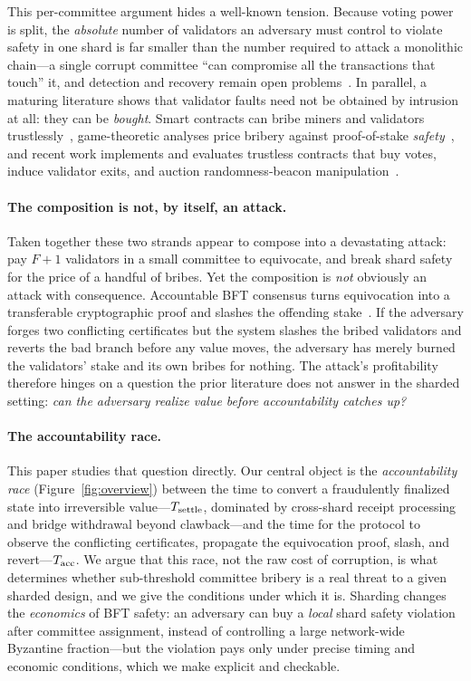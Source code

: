 This per-committee argument hides a well-known tension. Because voting power is split, the
\emph{absolute} number of validators an adversary must control to violate safety in one shard is
far smaller than the number required to attack a monolithic chain---a single corrupt committee
``can compromise all the transactions that touch'' it, and detection and recovery remain open
problems~\cite{bano2019sok}. In parallel, a maturing literature shows that validator faults need
not be obtained by intrusion at all: they can be \emph{bought}. Smart contracts can bribe miners
and validators trustlessly~\cite{mccorry2018smart,winzer2019temporary,tran2023crosschain},
game-theoretic analyses price bribery against proof-of-stake \emph{safety}~\cite{karakostas2024bribing},
and recent work implements and evaluates trustless contracts that buy votes, induce validator
exits, and auction randomness-beacon manipulation~\cite{sookitoth2025bribers,kelkar2025omerta,austgen2025liquefaction}.

\paragraph{The composition is not, by itself, an attack.}
Taken together these two strands appear to compose into a devastating attack: pay $F+1$
validators in a small committee to equivocate, and break shard safety for the price of a handful
of bribes. Yet the composition is \emph{not} obviously an attack with consequence. Accountable
BFT consensus turns equivocation into a transferable cryptographic proof and slashes the offending
stake~\cite{buterin2017casper,buchman2018tendermint}. If the adversary forges two conflicting
certificates but the system slashes the bribed validators and reverts the bad branch before any
value moves, the adversary has merely burned the validators' stake and its own bribes for nothing.
The attack's profitability therefore hinges on a question the prior literature does not answer in
the sharded setting: \emph{can the adversary realize value before accountability catches up?}

\paragraph{The accountability race.}
This paper studies that question directly. Our central object is the \emph{accountability race}
(Figure~\ref{fig:overview}) between the time to convert a fraudulently finalized state into irreversible
value---$T_{\mathrm{settle}}$, dominated by cross-shard receipt processing and bridge withdrawal beyond
clawback---and the time for the protocol to observe the conflicting certificates, propagate the
equivocation proof, slash, and revert---$T_{\mathrm{acc}}$. We argue that this race, not the raw cost of
corruption, is what determines whether sub-threshold committee bribery is a real threat to a
given sharded design, and we give the conditions under which it is. Sharding changes the
\emph{economics} of BFT safety: an adversary can buy a \emph{local} shard safety violation after
committee assignment, instead of controlling a large network-wide Byzantine fraction---but the
violation pays only under precise timing and economic conditions, which we make explicit and
checkable.

